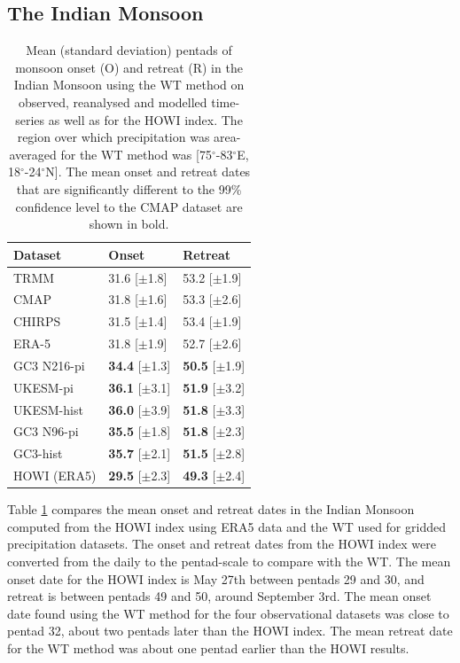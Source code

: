 \subsection{The Indian Monsoon}
\begin{table}
\caption{Mean (standard deviation) pentads of monsoon onset (O) and retreat (R) in the Indian Monsoon using the WT method on observed, reanalysed and modelled time-series as well as for the HOWI index. The region over which precipitation was area-averaged for the WT method was [75$^\circ$-83$^\circ$E, 18$^\circ$-24$^\circ$N]. The mean onset and retreat dates that are significantly different to the 99\% confidence level to the CMAP dataset are shown in bold.  }
\label{tab:3a}       %
\begin{tabular}{p{4cm}p{3.5cm}p{3.5cm}}
\hline\centering{\smallskip}
Dataset & Onset 	& Retreat 	\\ \hline
TRMM & 31.6 [$\pm$1.8] & 53.2 [$\pm$1.9]   \\
CMAP & 31.8 [$\pm$1.6] & 53.3 [$\pm$2.6]   \\
CHIRPS & 31.5 [$\pm$1.4] & 53.4 [$\pm$1.9]    \\
ERA-5 & 31.8 [$\pm$1.9] & 52.7 [$\pm$2.6]    \\
GC3 N216-pi  & {\bf34.4} [$\pm$1.3] & {\bf 50.5} [$\pm$1.9] \\
UKESM-pi & {\bf36.1} [$\pm$3.1] & {\bf 51.9} [$\pm$3.2]   \\
UKESM-hist & {\bf36.0} [$\pm$3.9] & {\bf51.8} [$\pm$3.3]   \\
GC3 N96-pi & {\bf35.5} [$\pm$1.8] & {\bf51.8} [$\pm$2.3]  \\
GC3-hist & {\bf35.7} [$\pm$2.1] & {\bf51.5} [$\pm$2.8]  \\
HOWI (ERA5) & {\bf29.5} [$\pm$2.3] & {\bf49.3} [$\pm$2.4]
\end{tabular}
\end{table}

Table \ref{tab:3a} compares the mean onset and retreat dates in the Indian Monsoon computed from the HOWI index using ERA5 data and the WT used for gridded precipitation datasets.
The onset and retreat dates from the HOWI index were converted from the daily to the pentad-scale to compare with the WT. The mean onset date for the HOWI index is May 27th between pentads 29 and 30, and retreat is between pentads 49 and 50, around September 3rd. The mean onset date found using the WT method for the four observational datasets was close to pentad 32, about two pentads later than the HOWI index. The mean retreat date for the WT method was about one pentad earlier than the HOWI results.


